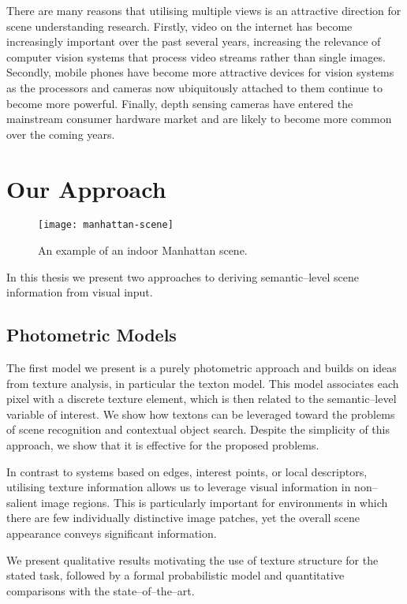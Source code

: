 There are many reasons that utilising multiple views is an attractive
direction for scene understanding research. Firstly, video on the
internet has become increasingly important over the past several
years, increasing the relevance of computer vision systems that
process video streams rather than single images. Secondly, mobile
phones have become more attractive devices for vision systems as the
processors and cameras now ubiquitously attached to them continue to
become more powerful. Finally, depth sensing cameras have entered the
mainstream consumer hardware market and are likely to become more
common over the coming years.

\section{Our Approach}

\begin{figure}[tb]%
  \centering
    \texttt{[image: manhattan-scene]}
    \caption{An example of an indoor Manhattan scene.}
  \label{fig:manhattan-eg}
\end{figure}

In this thesis we present two approaches to deriving semantic--level
scene information from visual input. 

\subsection{Photometric Models}

The first model we present is a purely photometric approach and builds
on ideas from texture analysis, in particular the texton model. This
model associates each pixel with a discrete texture element, which is
then related to the semantic--level variable of interest. We show how
textons can be leveraged toward the problems of scene recognition and
contextual object search. Despite the simplicity of this approach, we
show that it is effective for the proposed problems.

In contrast to systems based on edges, interest points, or local
descriptors, utilising texture information allows us to leverage
visual information in non--salient image regions. This is particularly
important for environments in which there are few individually
distinctive image patches, yet the overall scene appearance conveys
significant information.

We present qualitative results motivating the use of texture structure
for the stated task, followed by a formal probabilistic model and
quantitative comparisons with the state--of--the--art.

